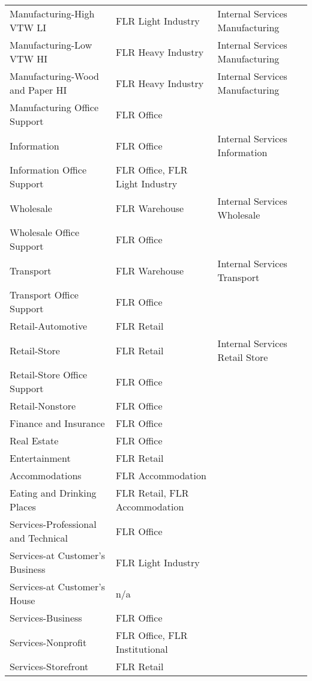 \begin{table}
\begin{tabular}{|l|l|l|}
Manufacturing-High VTW LI       & FLR Light Industry & Internal Services Manufacturing \\
Manufacturing-Low VTW HI        & FLR Heavy Industry & Internal Services Manufacturing \\
Manufacturing-Wood and Paper HI & FLR Heavy Industry & Internal Services Manufacturing \\
Manufacturing Office Support    & FLR Office & \\
\hline
Information                     & FLR Office & Internal Services Information \\
Information Office Support      & FLR Office, FLR Light Industry & \\
\hline
Wholesale                       & FLR Warehouse & Internal Services Wholesale \\
Wholesale Office Support        & FLR Office & \\
\hline
Transport                       & FLR Warehouse & Internal Services Transport \\
Transport Office Support        & FLR Office &  \\
\hline
Retail-Automotive               & FLR Retail &  \\
Retail-Store                    & FLR Retail & Internal Services Retail Store \\
Retail-Store Office Support     & FLR Office &  \\
Retail-Nonstore                 & FLR Office &  \\
\hline
Finance and Insurance           & FLR Office &  \\
Real Estate                     & FLR Office &  \\
\hline
Entertainment                   & FLR Retail &  \\
Accommodations                  & FLR Accommodation &  \\
Eating and Drinking Places      & FLR Retail, FLR Accommodation &  \\
Services-Professional and Technical & FLR Office &  \\
Services-at Customer's Business & FLR Light Industry &  \\
Services-at Customer's House    & n/a &  \\
Services-Business               & FLR Office &  \\
Services-Nonprofit              & FLR Office, FLR Institutional &  \\
Services-Storefront             & FLR Retail &  \\

\end{tabular}
\end{table}
